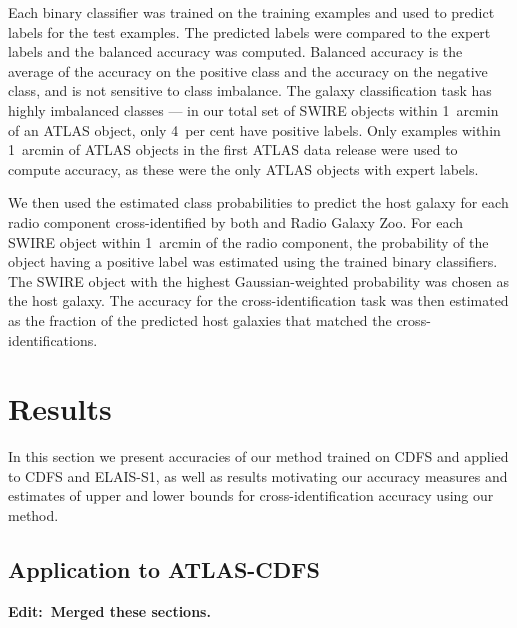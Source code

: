 \documentclass[fleqn,usenatbib,usedcolumn]{mnras}
\newcommand{\edit}[1]{{\bf Edit:~{#1}}}
\begin{document}
    Each binary classifier was trained on the training examples and used to predict labels for the test examples. The predicted labels were compared to the expert labels and the balanced accuracy was computed. Balanced accuracy is the average of the accuracy on the positive class and the accuracy on the negative class, and is not sensitive to class imbalance. The galaxy classification task has highly imbalanced classes --- in our total set of SWIRE objects within 1~arcmin of an ATLAS object, only 4~per cent have positive labels. Only examples within 1~arcmin of ATLAS objects in the first ATLAS data release \citep{norris06} were used to compute accuracy, as these were the only ATLAS objects with expert labels.

    We then used the estimated class probabilities to predict the host galaxy for
    each radio component cross-identified by both \citet{norris06} and Radio
    Galaxy Zoo. For each SWIRE object within 1~arcmin of the radio component,
    the probability of the object having a positive label was estimated using
    the trained binary classifiers. The SWIRE object with the highest Gaussian-weighted
    probability was chosen as the host galaxy. The accuracy for the cross-identification task was then estimated
    as the fraction of the predicted host galaxies that matched the \citet{norris06} cross-identifications.

\section{Results}\label{sec:results}

  In this section we present accuracies of our method trained on CDFS and applied to CDFS and ELAIS-S1, as well as results motivating our accuracy
  measures and estimates of upper and lower bounds for cross-identification accuracy using our method.

  \subsection{Application to ATLAS-CDFS}

    \edit{Merged these sections.}
\end{document}
